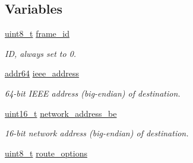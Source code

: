 \subsection*{Variables}
\begin{DoxyCompactItemize}
\item 
\hypertarget{group__xbee__route_ga03c1016ac46b9df250b994f242cf956a}{\hyperlink{group__hal_gae1affc9ca37cfb624959c866a73f83c2}{uint8\-\_\-t} \hyperlink{group__xbee__route_ga03c1016ac46b9df250b994f242cf956a}{frame\-\_\-id}}\label{group__xbee__route_ga03c1016ac46b9df250b994f242cf956a}

\begin{DoxyCompactList}\small\item\em I\-D, always set to 0. \end{DoxyCompactList}\item 
\hyperlink{unionaddr64}{addr64} \hyperlink{group__xbee__route_ga2549f921e25a72dfa05a2154a792e2bf}{ieee\-\_\-address}
\begin{DoxyCompactList}\small\item\em 64-\/bit I\-E\-E\-E address (big-\/endian) of destination. \end{DoxyCompactList}\item 
\hyperlink{group__hal_ga5a8b2dc9e45a9ee81a94ef304fb62505}{uint16\-\_\-t} \hyperlink{group__xbee__route_ga73d48563eb05cd5fcc4add79d226a3b8}{network\-\_\-address\-\_\-be}
\begin{DoxyCompactList}\small\item\em 16-\/bit network address (big-\/endian) of destination. \end{DoxyCompactList}\item 
\hypertarget{group__xbee__route_gad1af5d8a8f1c2531c591cc5fdd7bff8d}{\hyperlink{group__hal_gae1affc9ca37cfb624959c866a73f83c2}{uint8\-\_\-t} \hyperlink{group__xbee__route_gad1af5d8a8f1c2531c591cc5fdd7bff8d}{route\-\_\-options}}\label{group__xbee__route_gad1af5d8a8f1c2531c591cc5fdd7bff8d}


\end{DoxyCompactItemize}
